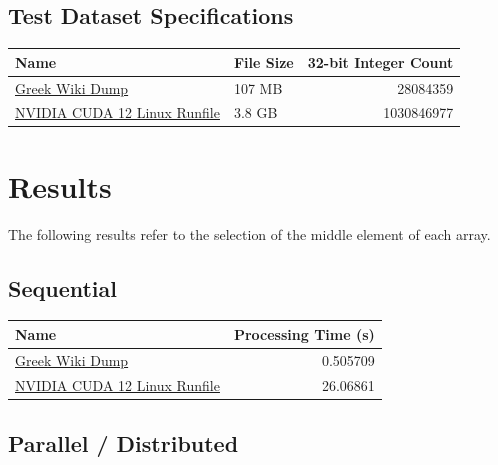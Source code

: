 \documentclass[11pt]{article}
\begin{document}
\subsection{Test Dataset Specifications}
\label{sec:org71b0aba}
\begin{center}
\begin{tabular}{llr}
\hline
Name & File Size & 32-bit Integer Count\\[0pt]
\hline
\href{https://dumps.wikimedia.org/other/static\_html\_dumps/current/el/wikipedia-el-html.tar.7z}{Greek Wiki Dump} & 107 MB & 28084359\\[0pt]
\href{https://developer.download.nvidia.com/compute/cuda/12.0.0/local\_installers/cuda\_12.0.0\_525.60.13\_linux.run}{NVIDIA CUDA 12 Linux Runfile} & 3.8 GB & 1030846977\\[0pt]
\hline
\end{tabular}
\end{center}
\pagebreak
\section{Results}
\label{sec:orgaceb5ec}
The following results refer to the selection of the middle element of each array.
\subsection{Sequential}
\label{sec:org7ea6a36}
\begin{center}
\begin{tabular}{lr}
\hline
Name & Processing Time (s)\\[0pt]
\hline
\href{https://dumps.wikimedia.org/other/static\_html\_dumps/current/el/wikipedia-el-html.tar.7z}{Greek Wiki Dump} & 0.505709\\[0pt]
\href{https://developer.download.nvidia.com/compute/cuda/12.0.0/local\_installers/cuda\_12.0.0\_525.60.13\_linux.run}{NVIDIA CUDA 12 Linux Runfile} & 26.06861\\[0pt]
\hline
\end{tabular}
\end{center}
\subsection{Parallel / Distributed}
\label{sec:orgdbe6791}
\end{document}
